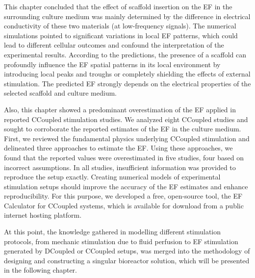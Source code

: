 This chapter concluded that the effect of scaffold insertion on the \acs{EF} in the surrounding culture medium was mainly determined by the difference in electrical conductivity of these two materials (at low-frequency signals). The numerical simulations pointed to significant variations in local \acs{EF} patterns, which could lead to different cellular outcomes and confound the interpretation of the experimental results. According to the predictions, the presence of a scaffold can profoundly influence the \acs{EF} spatial patterns in its local environment by introducing local peaks and troughs or completely shielding the effects of external stimulation. The predicted \acs{EF} strongly depends on the electrical properties of the selected scaffold and culture medium. 

Also, this chapter showed a predominant overestimation of the \acs{EF} applied in reported \acs{CCoupled} stimulation studies. We analyzed eight CCoupled studies and sought to corroborate the reported estimates of the \acs{EF} in the culture medium. First, we reviewed the fundamental physics underlying \acs{CCoupled} stimulation and delineated three approaches to estimate the \acs{EF}. Using these approaches, we found that the reported values were overestimated in five studies, four based on incorrect assumptions. In all studies, insufficient information was provided to reproduce the setup exactly. Creating numerical models of experimental stimulation setups should improve the accuracy of the \acs{EF} estimates and enhance reproducibility. For this purpose, we developed a free, open-source tool, the \acs{EF} Calculator for \acs{CCoupled} systems, which is available for download from a public internet hosting platform.

At this point, the knowledge gathered in modelling different stimulation protocols, from mechanic stimulation due to fluid perfusion to \acs{EF} stimulation generated by \acs{DCoupled} or \acs{CCoupled} setups, was merged into the methodology of designing and constructing a singular bioreactor solution, which will be presented in the following chapter. 

% 
%
%